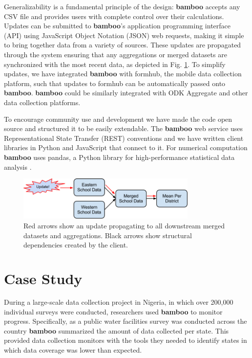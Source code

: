 \documentclass{sig-alternate}
\begin{document}
Generalizability is a fundamental principle of the design: \textbf{bamboo} accepts any
CSV file and provides users with complete control over their calculations.
Updates can be submitted to \textbf{bamboo}'s application programming interface (API) using
JavaScript Object Notation (JSON) web requests, making it
simple to bring together data from a variety of sources.
These updates are propagated through the system ensuring that any aggregations
or merged datasets are synchronized with the most recent data, as depicted in Fig. \ref{fig:updates}.
To simplify updates, we have integrated \textbf{bamboo} with formhub, the mobile data collection platform,
such that updates to formhub can be automatically passed onto \textbf{bamboo}.
\textbf{bamboo} could be similarly integrated with ODK Aggregate and other data
collection platforms.

To encourage community use and development we have made the code open source and
structured it to be easily extendable. The \textbf{bamboo} web service uses
Representational State Transfer (REST)
conventions and we have written client libraries in Python and JavaScript that
connect to it.  For numerical computation \textbf{bamboo} uses pandas, a
Python library for high-performance statistical data analysis \cite{mckinney}.

\begin{figure}
\centering
\includegraphics[width=3.5in]{figures/update_flow}
\caption{Red arrows show an update propagating to all downstream merged datasets and aggregations.  Black arrows show structural dependencies created by the client.}
\label{fig:updates}
\end{figure}

\section{Case Study}

During a large-scale data collection project in Nigeria, in which over 200,000 individual
surveys were conducted, researchers used
\textbf{bamboo} to monitor progress.
Specifically, as a public water facilities survey was conducted across the country
\textbf{bamboo} summarized the amount of data collected per state.
This provided data collection monitors with the tools they needed to identify states in which data coverage was lower than expected.
\end{document}

